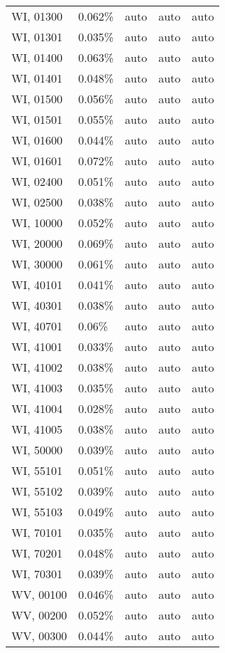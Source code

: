 \begin{longtable}[]{@{}lllll@{}}
WI, 01300 & 0.062\% & auto & auto & auto \\
WI, 01301 & 0.035\% & auto & auto & auto \\
WI, 01400 & 0.063\% & auto & auto & auto \\
WI, 01401 & 0.048\% & auto & auto & auto \\
WI, 01500 & 0.056\% & auto & auto & auto \\
WI, 01501 & 0.055\% & auto & auto & auto \\
WI, 01600 & 0.044\% & auto & auto & auto \\
WI, 01601 & 0.072\% & auto & auto & auto \\
WI, 02400 & 0.051\% & auto & auto & auto \\
WI, 02500 & 0.038\% & auto & auto & auto \\
WI, 10000 & 0.052\% & auto & auto & auto \\
WI, 20000 & 0.069\% & auto & auto & auto \\
WI, 30000 & 0.061\% & auto & auto & auto \\
WI, 40101 & 0.041\% & auto & auto & auto \\
WI, 40301 & 0.038\% & auto & auto & auto \\
WI, 40701 & 0.06\% & auto & auto & auto \\
WI, 41001 & 0.033\% & auto & auto & auto \\
WI, 41002 & 0.038\% & auto & auto & auto \\
WI, 41003 & 0.035\% & auto & auto & auto \\
WI, 41004 & 0.028\% & auto & auto & auto \\
WI, 41005 & 0.038\% & auto & auto & auto \\
WI, 50000 & 0.039\% & auto & auto & auto \\
WI, 55101 & 0.051\% & auto & auto & auto \\
WI, 55102 & 0.039\% & auto & auto & auto \\
WI, 55103 & 0.049\% & auto & auto & auto \\
WI, 70101 & 0.035\% & auto & auto & auto \\
WI, 70201 & 0.048\% & auto & auto & auto \\
WI, 70301 & 0.039\% & auto & auto & auto \\
WV, 00100 & 0.046\% & auto & auto & auto \\
WV, 00200 & 0.052\% & auto & auto & auto \\
WV, 00300 & 0.044\% & auto & auto & auto \\

\end{longtable}
